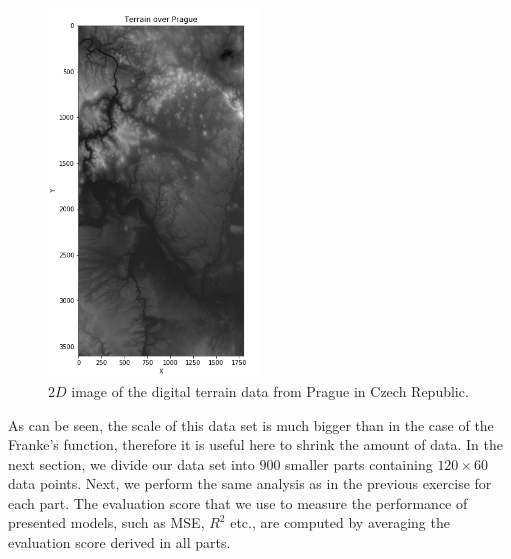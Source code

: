 \documentclass [11pt]{article}
\begin{document}
\begin{figure}[H]
\centering
\includegraphics[width=0.5\textwidth]{figures/TerrainPrague.png}
        \caption{$2D$ image of the digital terrain data from Prague in Czech Republic.}
        \label{fig:TerrainPrague}
\end{figure}
As can be seen, the scale of this data set is much bigger than in the case of the Franke's function, therefore it is useful here to shrink the amount of data. In the next section, we divide our data set into $900$ smaller parts containing $120 \times 60$ data points. Next, we perform the same analysis as in the previous exercise for each part. The evaluation score that we use to measure the performance of presented models, such as MSE, $R^{2}$ etc., are computed by averaging the evaluation score derived in all parts. \\
\end{document}
